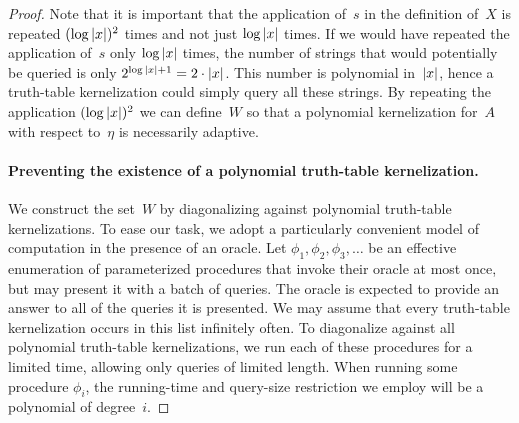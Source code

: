 \begin{proof}
  Note that it is important that the application of~$s$ in the definition of~$X$ is repeated $(\log{\lvert x\rvert})^2$ times and not just $\log{\lvert x\rvert}$ times.
  If we would have repeated the application of~$s$ only $\log{\lvert x\rvert}$ times, the number of strings that would potentially be queried is only $2^{\log{\lvert x\rvert} + 1} = 2 \cdot {\lvert x\rvert}$.
  This number is polynomial in~${\lvert x\rvert}$, hence a truth-table kernelization could simply query all these strings.
  By repeating the application $(\log{\lvert x\rvert})^2$ we can define~$W$ so that a polynomial kernelization for~$A$ with respect to~$\eta$ is necessarily adaptive.

  \paragraph{Preventing the existence of a polynomial truth-table kernelization.}
  We construct the set~$W$ by diagonalizing against polynomial truth-table kernelizations.
  To ease our task, we adopt a particularly convenient model of computation in the presence of an oracle.
  Let $\phi_1, \phi_2, \phi_3, \ldots$ be an effective enumeration of parameterized procedures that invoke their oracle at most once, but may present it with a batch of queries.
  The oracle is expected to provide an answer to all of the queries it is presented.
  We may assume that every truth-table kernelization occurs in this list infinitely often.
  To diagonalize against all polynomial truth-table kernelizations, we run each of these procedures for a limited time, allowing only queries of limited length.
  When running some procedure $\phi_i$, the running-time and query-size restriction we employ will be a polynomial of degree~$i$.


\end{proof}
